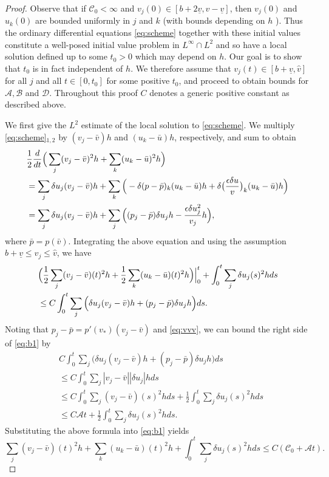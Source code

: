 \documentclass[a4paper,oneside,11pt]{article}
\numberwithin{equation}{section}
\begin{document}
\begin{proof}
Observe that if \(\mathscr{C}_{0}<\infty\) and $v_{j}(0)\in [b+2\underline{v},\hat{v}-\underline{v}] $, then \(v_j(0)\) and \(u_k(0)\) are bounded uniformly in \(j\) and \(k\) (with bounds depending on \(h\) ). Thus the ordinary  differential equations \eqref{eq:scheme} together with these initial values constitute a well-posed initial value problem in \(L^{\infty}\cap L^{2}\) and so have a local solution defined up to some \(t_0>0\) which may depend on $h$. Our goal is to show that \(t_{0}\) is in fact independent of \(h\). We therefore assume that $v_{j}(t)\in [b+\underline{v},\hat{v}]$ for all $j$ and all $t\in [0,t_0]$ for some positive $t_0$, and proceed to obtain bounds for $\mathscr{A}, \mathscr{B}$ and $\mathscr{D}$. 
Throughout this proof $C$ denotes a generic positive constant as described above. 

We first give the  $L^2$ estimate of the local solution to \eqref{eq:scheme}. We multiply \eqref{eq:scheme}$_{1,2}$ by \((v_j-\bar v)h\) and \((u_k-\bar u)h\), respectively, and sum to obtain
\begin{align*}
\displaystyle  &\frac12\frac{d}{dt}\Big(\sum_{j} (v_j-\bar v)^{2}h+\sum_{k}(u_k-\bar u)^2h\Big)\\&=\sum_{j}\delta u_j(v_j-\bar v)h+\sum_{k}\Big(-\delta(p-\bar p)_k(u_k-\bar u)h+\delta\big(\frac{\epsilon\delta u}{v}\big)_k(u_k-\bar u)h\Big)\\
&=\sum_{j}\delta u_j(v_j-\bar v)h+\sum_{j}\Big((p_j-\bar p)\delta u_jh-\frac{\epsilon\delta u_j^2}{v_j}h\Big),
\end{align*}
where $\bar{p}=p({\bar v})$. Integrating the above equation and using the assumption $b+\underline{v}\leq v_j\leq \hat{v}$, we have
\begin{equation}\label{eq:b1}
\begin{aligned}
\displaystyle  &\Big(\frac12\sum_{j} (v_j-\bar v)(t)^{2}h+\frac12\sum_{k}(u_k-\bar u)(t)^2h\Big)\Big|^t_0+\int_0^t \sum_{j}\delta u_j(s)^2hds\\
&\leq C\int_0^t\sum_{j}\Big(\delta u_j(v_j-\bar v)h+(p_j-\bar p)\delta u_jh\Big)ds.\\
\end{aligned}  
\end{equation}
Noting that \(p_j-\bar p=p'(v_*)(v_j-\bar v)\) and \eqref{eq:vvv}, we can bound the right side of \eqref{eq:b1} by
\[\begin{aligned}
&C\int_0^t\sum_{j}\Big(\delta u_j(v_j-\bar v)h+(p_j-\bar p)\delta u_jh\Big)ds\\& \leq C\int_{0}^{t}\sum_{j}|v_{j}-\bar v||\delta u_j|hds \\&\leq C\int_{0}^{t}\sum_{j}(v_{j}-\bar v)(s)^2hds+\frac12\int_{0}^{t}\sum_{j}\delta u_j(s)^2hds\\&\leq C\mathscr{A}t+\frac12\int_{0}^{t}\sum_{j}\delta u_j(s)^2hds.
\end{aligned}\]
Substituting the above formula into \eqref{eq:b1} yields
\begin{equation}\label{eq:b0}
  \sum_{j}(v_{j}-\bar v)(t)^{2}h+\sum_{k}(u_{k}-\bar u)(t)^{2}h+\int_{0}^{t}\sum\limits_{j}\delta u_{j}(s)^{2}hds\leq C({\mathscr{C}}_{0}+{\mathscr{A}}t).
\end{equation} 


\end{proof}
\end{document}
